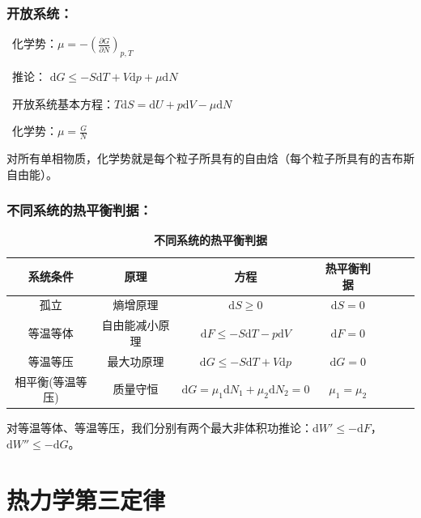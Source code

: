 \documentclass[zihao=5,UTF8]{report}
\begin{document}
\subsubsection{开放系统：}
\par{}\  化学势：$\mu = -\left(\frac{\partial G}{\partial N}\right)_{p,T}$\par
{}\  推论： $\mathrm{d}G \le -S\mathrm{d}T + V\mathrm{d}p +\mu \mathrm{d}N$  \par
{}\   开放系统基本方程：$T\mathrm{d}S = \mathrm{d}U + p\mathrm{d}V - \mu \mathrm{d}N$  \par
{}\   化学势：$\mu =\frac{G}{N}$  \par
{\par\color{gray}\small
对所有单相物质，化学势就是每个粒子所具有的自由焓（每个粒子所具有的吉布斯自由能）。
\par}

\subsubsection{不同系统的热平衡判据：}

\begin{table}[H]
    \caption{\textbf{不同系统的热平衡判据}}
    \centering
    \begin{tabular}{ccccccc} 
    \toprule
    系统条件& 原理 &方程 & 热平衡判据 \\
    \hline
    孤立 & 熵增原理 &$\mathrm{d}S \ge 0$ & $\mathrm{d}S=0$\\
    等温等体 & 自由能减小原理 & $\mathrm{d}F \le -S\mathrm{d}T - p\mathrm{d}V$  & $\mathrm{d}F = 0$\\
    等温等压 & 最大功原理 & $\mathrm{d}G \le -S\mathrm{d}T + V\mathrm{d}p $& $\mathrm{d}G = 0$ \\
    相平衡(等温等压) & 质量守恒 & $\mathrm{d}G = \mu_1 \mathrm{d}N_1 + \mu_2\mathrm{d}N_2 = 0$& $\mu_1 = \mu_2$ \\
    \bottomrule
    \end{tabular}
\end{table}
{\par\color{gray}\small
对等温等体、等温等压，我们分别有两个最大非体积功推论：$\mathrm{d}W'\le -\mathrm{d}F$，$\mathrm{d}W'' \le -\mathrm{d}G$。

\par}


\section{热力学第三定律}
\end{document}
